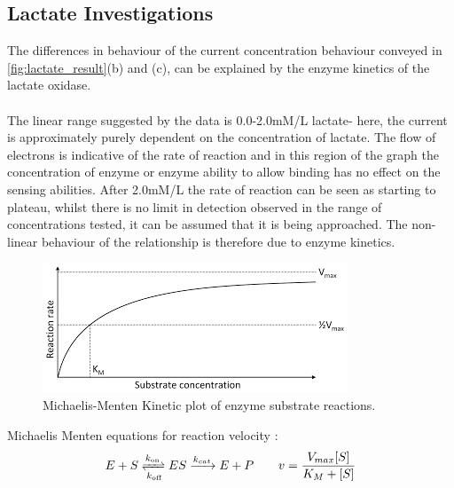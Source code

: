 \subsection{Lactate Investigations}
The differences in behaviour of the current concentration behaviour conveyed in \autoref{fig:lactate_result}(b) and (c), can be explained by the enzyme kinetics of the lactate oxidase.\\\\
The linear range suggested by the data is 0.0-2.0mM/L lactate- here, the current is approximately purely dependent on the concentration of lactate. The flow of electrons is indicative of the rate of reaction and in this region of the graph the concentration of enzyme or enzyme ability to allow binding has no effect on the sensing abilities. After 2.0mM/L the rate of reaction can be seen as starting to plateau, whilst there is no limit in detection observed in the range of concentrations tested, it can be assumed that it is being approached. The non-linear behaviour of the relationship is therefore due to enzyme kinetics.  
\begin{figure}[H]
    \centering
    \includegraphics{img/lactate_discussion_1.png}
    \caption{Michaelis-Menten Kinetic plot of enzyme substrate reactions. }
    \label{fig:lactate_discussion}
\end{figure}
Michaelis Menten equations for reaction velocity \cite{johnson2011original}:
\begin{equation}
    E + S \xrightleftharpoons[k_{\text{off}}]{k_{\text{on}}} ES \xrightarrow{k_{cat}} E+P \quad \quad v = \frac{V_{max}[S]}{K_{M}+[S]}
\end{equation}
